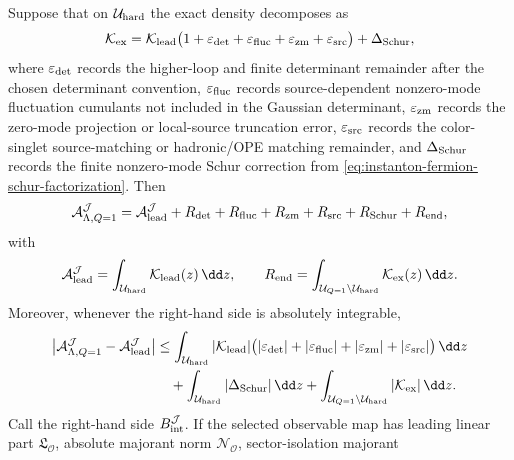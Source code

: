 \begin{proposition}
Suppose that on \(\mathcal U_{\rm hard}\) the exact density decomposes as
\begin{equation}
  \mathcal K_{\rm ex}
  =
  \mathcal K_{\rm lead}
  \bigl(1+\varepsilon_{\rm det}
          +\varepsilon_{\rm fluc}
          +\varepsilon_{\rm zm}
          +\varepsilon_{\rm src}\bigr)
  +\Delta_{\rm Schur},
  \label{eq:instanton-amplitude-error-density}
\end{equation}
where \(\varepsilon_{\rm det}\) records the higher-loop and finite determinant
remainder after the chosen determinant convention, \(\varepsilon_{\rm fluc}\)
records source-dependent nonzero-mode fluctuation cumulants not included in the
Gaussian determinant, \(\varepsilon_{\rm zm}\) records the zero-mode projection
or local-source truncation error, \(\varepsilon_{\rm src}\) records the
color-singlet source-matching or hadronic/OPE matching remainder, and
\(\Delta_{\rm Schur}\) records the finite nonzero-mode Schur correction from
\eqref{eq:instanton-fermion-schur-factorization}.  Then
\begin{equation}
  \mathcal A_{\Lambda,Q=1}^{\mathcal J}
  =
  \mathcal A_{\rm lead}^{\mathcal J}
  +R_{\rm det}+R_{\rm fluc}+R_{\rm zm}+R_{\rm src}
  +R_{\rm Schur}+R_{\rm end},
  \label{eq:instanton-amplitude-error-decomposition}
\end{equation}
with
\[
  \mathcal A_{\rm lead}^{\mathcal J}
  =
  \int_{\mathcal U_{\rm hard}}\mathcal K_{\rm lead}(z)\,\dd z,
  \qquad
  R_{\rm end}
  =
  \int_{\mathcal U_{Q=1}\setminus\mathcal U_{\rm hard}}
  \mathcal K_{\rm ex}(z)\,\dd z .
\]
Moreover, whenever the right-hand side is absolutely integrable,
\begin{equation}
\begin{aligned}
  \bigl|
  \mathcal A_{\Lambda,Q=1}^{\mathcal J}
  -\mathcal A_{\rm lead}^{\mathcal J}
  \bigr|
  &\le
  \int_{\mathcal U_{\rm hard}}
  |\mathcal K_{\rm lead}|
  \bigl(
    |\varepsilon_{\rm det}|
    +|\varepsilon_{\rm fluc}|
    +|\varepsilon_{\rm zm}|
    +|\varepsilon_{\rm src}|
  \bigr)\,\dd z  \\
  &\quad
  +\int_{\mathcal U_{\rm hard}}|\Delta_{\rm Schur}|\,\dd z
  +
  \int_{\mathcal U_{Q=1}\setminus\mathcal U_{\rm hard}}
  |\mathcal K_{\rm ex}|\,\dd z .
\end{aligned}
  \label{eq:instanton-amplitude-error-bound}
\end{equation}
Call the right-hand side \(B_{\rm int}^{\mathcal J}\).  If the selected
observable map has leading linear part \(\mathfrak L_{\mathcal O}\), absolute
majorant norm \(\mathcal N_{\mathcal O}\), sector-isolation majorant

\end{proposition}

